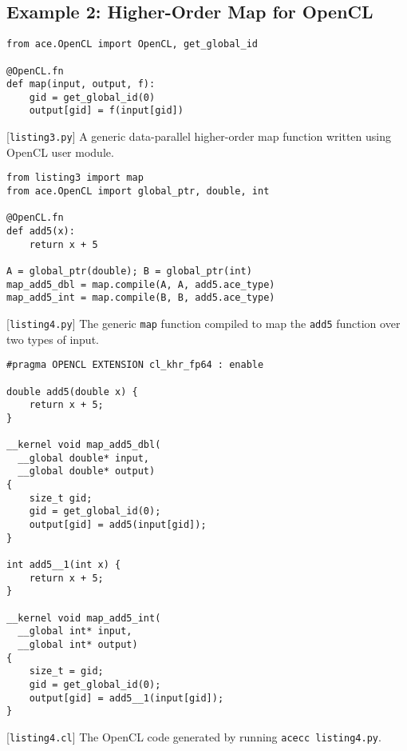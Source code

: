 \documentclass[10pt, conference, compsocconf]{IEEEtran}
\begin{document}
\subsection{Example 2: Higher-Order Map for OpenCL}
\begin{codelisting}
\begin{lstlisting}
from ace.OpenCL import OpenCL, get_global_id

@OpenCL.fn
def map(input, output, f):
    gid = get_global_id(0)
    output[gid] = f(input[gid])
\end{lstlisting}
\caption{[\texttt{listing3.py}] A generic data-parallel higher-order map function written using OpenCL user module.}
\label{map}
\end{codelisting}

\begin{codelisting}
\begin{lstlisting}
from listing3 import map
from ace.OpenCL import global_ptr, double, int

@OpenCL.fn
def add5(x):
    return x + 5

A = global_ptr(double); B = global_ptr(int)
map_add5_dbl = map.compile(A, A, add5.ace_type)
map_add5_int = map.compile(B, B, add5.ace_type)
\end{lstlisting}
\caption{[\texttt{listing4.py}] The generic \texttt{map} function compiled to map the \texttt{add5} function over two  types of input.}
\label{mapadd5dbl}
\end{codelisting}

\begin{codelisting}
\begin{lstlisting}[style=OpenCL]
#pragma OPENCL EXTENSION cl_khr_fp64 : enable

double add5(double x) {
    return x + 5;
}

__kernel void map_add5_dbl(
  __global double* input, 
  __global double* output) 
{
    size_t gid;
    gid = get_global_id(0);
    output[gid] = add5(input[gid]);
}

int add5__1(int x) {
    return x + 5;
}

__kernel void map_add5_int(
  __global int* input,
  __global int* output)
{
    size_t = gid;
    gid = get_global_id(0);
    output[gid] = add5__1(input[gid]);
}
\end{lstlisting}
\caption{[\texttt{listing4.cl}] The OpenCL code generated by running \texttt{acecc listing4.py}.}
\label{mapout}
\end{codelisting}
\end{document}
